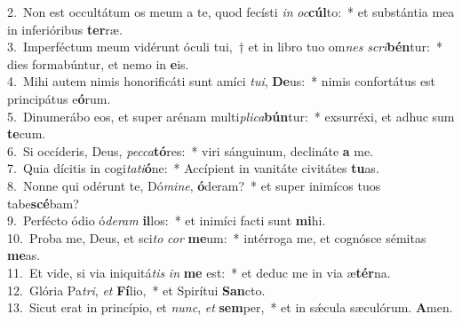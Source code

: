 {2.~}Non est occultátum os meum a te, quod fecísti \textit{in} \textit{oc}\textbf{cúl}to:~* et substántia mea in inferióribus \textbf{ter}ræ.\\
{3.~}Imperféctum meum vidérunt óculi tui,~† et in libro tuo om\textit{nes} \textit{scri}\textbf{bén}tur:~* dies formabúntur, et nemo in \textbf{e}is.\\
{4.~}Mihi autem nimis honorificáti sunt amíci \textit{tu}\textit{i}, \textbf{De}us:~* nimis confortátus est principátus e\textbf{ó}rum.\\
{5.~}Dinumerábo eos, et super arénam multi\textit{pli}\textit{ca}\textbf{bún}tur:~* exsurréxi, et adhuc sum \textbf{te}cum.\\
{6.~}Si occíderis, Deus, \textit{pec}\textit{ca}\textbf{tó}res:~* viri sánguinum, declináte \textbf{a} me.\\
{7.~}Quia dícitis in cogi\textit{ta}\textit{ti}\textbf{ó}ne:~* Accípient in vanitáte civitátes \textbf{tu}as.\\
{8.~}Nonne qui odérunt te, Dó\textit{mi}\textit{ne}, \textbf{ó}deram?~* et super inimícos tuos tabe\textbf{scé}bam?\\
{9.~}Perfécto ódio ó\textit{de}\textit{ram} \textbf{il}los:~* et inimíci facti sunt \textbf{mi}hi.\\
{10.~}Proba me, Deus, et sci\textit{to} \textit{cor} \textbf{me}um:~* intérroga me, et cognósce sémitas \textbf{me}as.\\
{11.~}Et vide, si via iniquitá\textit{tis} \textit{in} \textbf{me} est:~* et deduc me in via æ\textbf{tér}na.\\
{12.~}Glória Pa\textit{tri}, \textit{et} \textbf{Fí}lio,~* et Spirítui \textbf{San}cto.\\
{13.~}Sicut erat in princípio, et \textit{nunc}, \textit{et} \textbf{sem}per,~* et in sǽcula sæculórum. \textbf{A}men.\\
